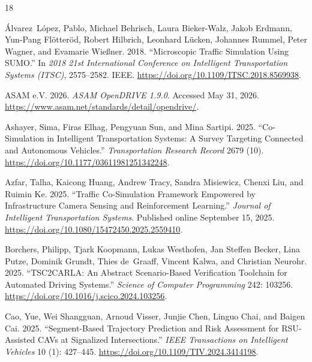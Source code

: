 \documentclass[10pt,numbered]{\selectedmanuscriptclass}
\begin{document}
\newpage
\begin{thebibliography}{18}
\providecommand{\natexlab}[1]{#1}

{\'A}lvarez~L{\'o}pez, Pablo, Michael Behrisch, Laura Bieker-Walz, Jakob
  Erdmann, Yun-Pang Fl{\"o}tter{\"o}d, Robert Hilbrich, Leonhard L{\"u}cken,
  Johannes Rummel, Peter Wagner, and Evamarie Wie{\ss}ner. 2018. ``Microscopic
  Traffic Simulation Using {SUMO}.'' In \emph{2018 21st International
  Conference on Intelligent Transportation Systems (ITSC)}, 2575--2582. IEEE.
  \url{https://doi.org/10.1109/ITSC.2018.8569938}.

{ASAM e.V.} 2026. \emph{{ASAM OpenDRIVE 1.9.0}}. Accessed May 31, 2026.
  \url{https://www.asam.net/standards/detail/opendrive/}.

Ashayer, Sima, Firas Elhag, Pengyuan Sun, and Mina Sartipi. 2025.
  ``Co-Simulation in Intelligent Transportation Systems: A Survey Targeting
  Connected and Autonomous Vehicles.'' \emph{Transportation Research Record}
  2679 (10). \url{https://doi.org/10.1177/03611981251342248}.

Azfar, Talha, Kaicong Huang, Andrew Tracy, Sandra Misiewicz, Chenxi Liu, and
  Ruimin Ke. 2025. ``Traffic Co-Simulation Framework Empowered by
  Infrastructure Camera Sensing and Reinforcement Learning.'' \emph{Journal of
  Intelligent Transportation Systems}. Published online September 15, 2025.
  \url{https://doi.org/10.1080/15472450.2025.2559410}.

Borchers, Philipp, Tjark Koopmann, Lukas Westhofen, Jan Steffen Becker, Lina
  Putze, Dominik Grundt, Thies de~Graaff, Vincent Kalwa, and Christian Neurohr.
  2025. ``TSC2CARLA: An Abstract Scenario-Based Verification Toolchain for
  Automated Driving Systems.'' \emph{Science of Computer Programming} 242:
  103256. \url{https://doi.org/10.1016/j.scico.2024.103256}.

Cao, Yue, Wei Shangguan, Arnoud Visser, Junjie Chen, Linguo Chai, and Baigen
  Cai. 2025. ``Segment-Based Trajectory Prediction and Risk Assessment for
  RSU-Assisted CAVs at Signalized Intersections.'' \emph{IEEE Transactions on
  Intelligent Vehicles} 10 (1): 427--445.
  \url{https://doi.org/10.1109/TIV.2024.3414198}.


\end{thebibliography}
\end{document}
